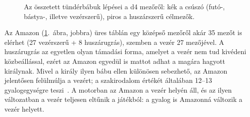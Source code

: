 \begin{figure}[!ht]
	\centering
	\hspace{6mm}
	\hspace{6mm}
	\caption{Az összetett tündérbábuk lépései a d4 mezőről: kék a csúszó (futó-, bástya-, illetve vezérszerű), piros a huszárszerű célmezők.}
	\label{fig:amazonMoves}
\end{figure}

Az Amazon (\ref{fig:amazonMoves}.~ábra, jobbra) üres táblán egy középső mezőről akár 35 mezőt is elérhet (27 vezérszerű + 8 huszárugrás), szemben a vezér 27 mezőjével. A huszárugrás az egyetlen olyan támadási forma, amelyet a vezér nem tud kivédeni közbeállással, ezért az Amazon egyedül is mattot adhat a magára hagyott királynak. Mivel a király ilyen bábu ellen különösen sebezhető, az Amazon jelentősen felülmúlja a vezért; a szakirodalom értékét általában 12--13 gyalogegységre teszi~\cite{ChessVariantsAmazon}. A motorban az Amazon a vezér helyén áll, és az ilyen változatban a vezér teljesen eltűnik a játékból: a gyalog is Amazonná változik a vezér helyett.
